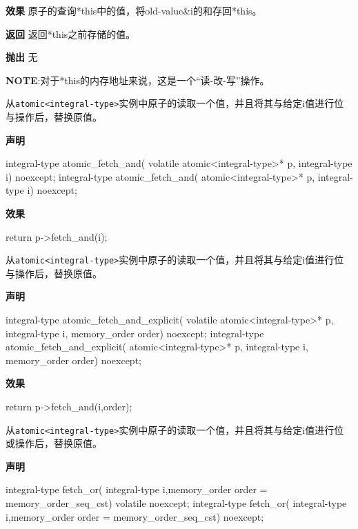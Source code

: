 \textbf{效果}
原子的查询*this中的值，将old-value\&i的和存回*this。

\textbf{返回}
返回*this之前存储的值。

\textbf{抛出}
无

\textbf{NOTE}:对于*this的内存地址来说，这是一个“读-改-写”操作。


从\texttt{atomic<integral-type>}实例中原子的读取一个值，并且将其与给定i值进行位与操作后，替换原值。

\textbf{声明}

\begin{cpp}
integral-type atomic_fetch_and(
    volatile atomic<integral-type>* p, integral-type i) noexcept;
integral-type atomic_fetch_and(
    atomic<integral-type>* p, integral-type i) noexcept;
\end{cpp}

\textbf{效果}

\begin{cpp}
return p->fetch_and(i);
\end{cpp}


从\texttt{atomic<integral-type>}实例中原子的读取一个值，并且将其与给定i值进行位与操作后，替换原值。

\textbf{声明}

\begin{cpp}
integral-type atomic_fetch_and_explicit(
    volatile atomic<integral-type>* p, integral-type i,
    memory_order order) noexcept;
integral-type atomic_fetch_and_explicit(
    atomic<integral-type>* p, integral-type i, memory_order order)
    noexcept;
\end{cpp}

\textbf{效果}

\begin{cpp}
return p->fetch_and(i,order);
\end{cpp}


从\texttt{atomic<integral-type>}实例中原子的读取一个值，并且将其与给定i值进行位或操作后，替换原值。

\textbf{声明}

\begin{cpp}
integral-type fetch_or(
    integral-type i,memory_order order = memory_order_seq_cst)
    volatile noexcept;
integral-type fetch_or(
    integral-type i,memory_order order = memory_order_seq_cst) noexcept;
\end{cpp}

